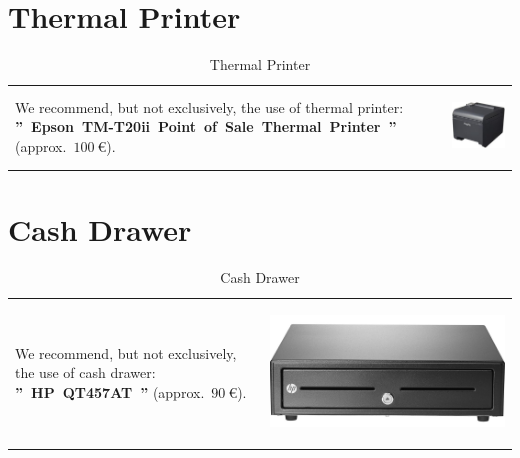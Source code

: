 \documentclass[12pt, a4paper]{article}
\newcommand{\money}[1]{$#1\ \euro{}$\xspace}
\begin{document}
\vspace{-0.8em}
\section{Thermal Printer}
\vspace{-2.7em}

\begin{table}[!htbp]
\begin{tabular}{lr}
\parbox{25em}{
We recommend, but not exclusively,
the use of thermal printer: 
\textbf{''~Epson~TM-T20ii~Point~of~Sale~Thermal~Printer~''}
(approx.~\money{100}).
\vspace{-3em}
}

&

\parbox{17em}{
\begin{center}
\includegraphics[scale=0.27]{images/epson-tm-t20-pos-thermal-printer.png}
\caption*{Thermal Printer}
\end{center}
}
\end{tabular}
\end{table}

\vspace{0em}
\section{Cash Drawer}
\vspace{-3.1em}

\begin{table}[!htbp]
\begin{tabular}{lr}
\parbox{25em}{
We recommend, but not exclusively,
the use of cash drawer:
\textbf{''~HP~QT457AT~''} (approx.~\money{90}).
\vspace{-3em}
}

&

\parbox{17em}{
\begin{center}
\includegraphics[scale=0.07]{images/hp-cash-drawer.png}
\caption*{Cash Drawer}
\end{center}
}
\end{tabular}
\end{table}
\end{document}
